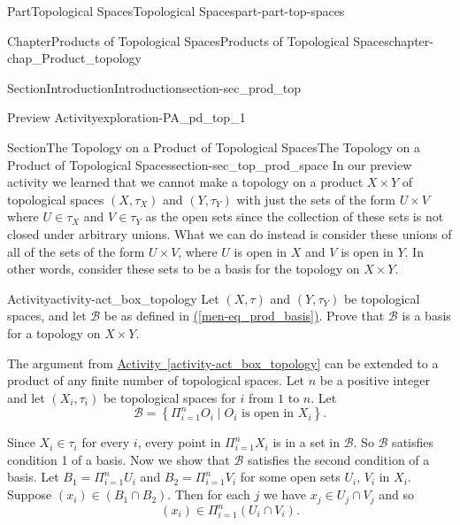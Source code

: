 \documentclass[oneside,10pt,]{book}
\newcommand{\xreffont}{\relax}
\numberwithin{equation}{chapter}
\newcommand{\CB}{\mathcal{B}}
\begin{document}
\begin{partptx}{Part}{Topological Spaces}{}{Topological Spaces}{}{}{part-part-top-spaces}
\begin{chapterptx}{Chapter}{Products of Topological Spaces}{}{Products of Topological Spaces}{}{}{chapter-chap_Product_topology}
\begin{sectionptx}{Section}{Introduction}{}{Introduction}{}{}{section-sec_prod_top}
\begin{exploration}{Preview Activity}{}{exploration-PA_pd_top_1}
\begin{enumerate}[font=\bfseries,label=(\alph*),ref=\alph*]
\end{enumerate}%
\end{exploration}%
\end{sectionptx}
%
%
\typeout{************************************************}
\typeout{************************************************}
%
\begin{sectionptx}{Section}{The Topology on a Product of Topological Spaces}{}{The Topology on a Product of Topological Spaces}{}{}{section-sec_top_prod_space}
In our preview activity we learned that we cannot make a topology on a product \(X \times Y\) of topological spaces \((X, \tau_X)\) and \((Y , \tau_Y)\) with just the sets of the form \(U \times V\) where \(U \in \tau_X\) and \(V \in \tau_Y\) as the open sets since the collection of these sets is not closed under arbitrary unions. What we can do instead is consider these unions of all of the sets of the form \(U \times V\), where \(U\) is open in \(X\) and \(V\) is open in \(Y\). In other words, consider these sets to be a basis for the topology on \(X \times Y\).%
\begin{activity}{Activity}{}{activity-act_box_topology}%
Let \((X, \tau)\) and \((Y, \tau_Y)\) be topological spaces, and let \(\CB\) be as defined in \hyperref[men-eq_prod_basis]{({\xreffont\ref{men-eq_prod_basis}})}. Prove that \(\CB\) is a basis for a topology on \(X \times Y\).%
\end{activity}%
The argument from \hyperref[activity-act_box_topology]{Activity~{\xreffont\ref{activity-act_box_topology}}} can be extended to a product of any finite number of topological spaces. Let \(n\) be a positive integer and let \((X_i, \tau_i)\) be topological spaces for \(i\) from \(1\) to \(n\). Let%
\begin{equation*}
\CB = \left\{ \Pi_{i=1}^n O_i \mid O_i \text{ is open in }  X_i\right\}\text{.}
\end{equation*}
%
\par
Since \(X_i \in \tau_i\) for every \(i\), every point in \(\Pi_{i=1}^n X_i\) is in a set in \(\CB\). So \(\CB\) satisfies condition 1 of a basis. Now we show that \(\CB\) satisfies the second condition of a basis. Let \(B_1 = \Pi_{i=1}^n U_i\) and \(B_2 = \Pi_{i=1}^n V_i\) for some open sets \(U_i\), \(V_i\) in \(X_i\). Suppose \((x_i) \in (B_1 \cap B_2)\). Then for each \(j\) we have \(x_j \in U_j \cap V_j\) and so%
\begin{equation*}
(x_i) \in \Pi_{i=1}^n (U_i \cap V_i)\text{.}
\end{equation*}

\end{sectionptx}
\end{chapterptx}
\end{partptx}
\end{document}
